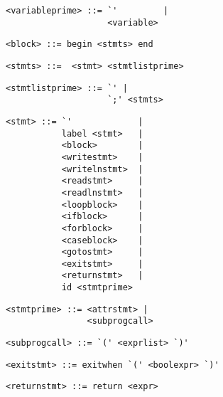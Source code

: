 \begin{footnotesize}
\begin{lstlisting}[frame=single, label={variableprime}, language=pie]
<variableprime> ::= `'         |
                    <variable> 
\end{lstlisting}

\begin{lstlisting}[frame=single, label={block}, language=pie]
<block> ::= begin <stmts> end
\end{lstlisting}

\begin{lstlisting}[frame=single, label={stmts}, language=pie]
<stmts> ::=  <stmt> <stmtlistprime>
\end{lstlisting}

\begin{lstlisting}[frame=single, label={stmtlistprime}, language=pie]
<stmtlistprime> ::= `' |
                    `;' <stmts>
\end{lstlisting}

\begin{lstlisting}[frame=single, label={stmt}, language=pie]
<stmt> ::= `'             | 
           label <stmt>   |
           <block>        |
           <writestmt>    |
           <writelnstmt>  |
           <readstmt>     |
           <readlnstmt>   |
           <loopblock>    |
           <ifblock>      |
           <forblock>     |
           <caseblock>    |
           <gotostmt>     |
           <exitstmt>     |
           <returnstmt>   |
           id <stmtprime>
\end{lstlisting}

\begin{lstlisting}[frame=single, label={stmtprime}, language=pie]
<stmtprime> ::= <attrstmt> |
                <subprogcall>
\end{lstlisting}

\begin{lstlisting}[frame=single, label={subprogcall}, language=pie]
<subprogcall> ::= `(' <exprlist> `)'
\end{lstlisting}

\begin{lstlisting}[frame=single, label={exitstmt}, language=pie]
<exitstmt> ::= exitwhen `(' <boolexpr> `)'
\end{lstlisting}

\begin{lstlisting}[frame=single, label={returnstmt}, language=pie]
<returnstmt> ::= return <expr>
\end{lstlisting}


\end{footnotesize}
